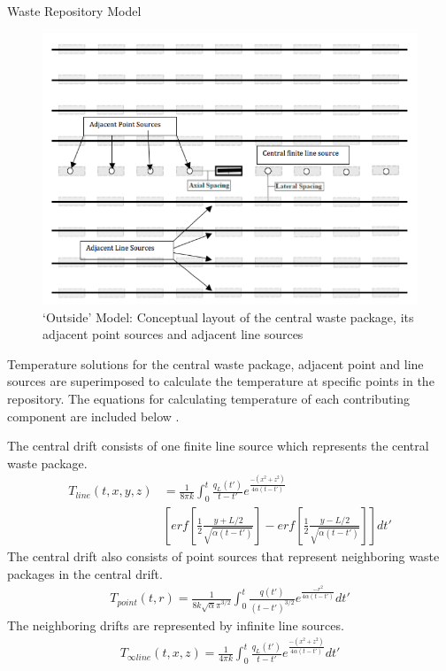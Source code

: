 \documentclass[final]{beamer}
\newlength{\onecolwid}
\newlength{\threecolwid}
\begin{document}
\begin{frame}[t]
\begin{columns}[t,totalwidth=\threecolwid]
\begin{column}{\onecolwid}
\begin{block}{Waste Repository Model}
\begin{figure}
	\label{fig:conceptual_layout}
	\includegraphics[width=1\linewidth]{outsidemodel}
	\caption{`Outside' Model: Conceptual layout of the central waste package, its adjacent
	point sources and adjacent line sources \cite{sutton_investigations_2011}}
\end{figure}

Temperature solutions for the central waste package, adjacent point and line sources 
are superimposed to calculate the temperature at specific points in the repository.
The equations for calculating temperature of each contributing component 
are included below \cite{sutton_investigations_2011,greenberg_application_2012,huff_numerical_2012}. 

The central drift consists of one finite line source which represents the central 
waste package.
\begin{align*}
	T_{line}(t,x,y,z) &= \frac{1}{8 \pi k}  \int _{0}^{t} \frac{q_L(t')}{t-t'}e^{\frac{-(x^2+z^2)}{4\alpha(t-t')}} \\
	&[erf[\frac{1}{2}\frac{y+L/2}{\sqrt{\alpha(t-t')}}]-erf[\frac{1}{2}\frac{y-L/2}{\sqrt{\alpha(t-t')}}]] dt'
\end{align*}
The central drift also consists of point sources that represent neighboring 
waste packages in the central drift. 
\begin{align*}
	T_{point}(t,r) = \frac{1}{8 k \sqrt{\alpha} \pi^{3/2}} \int_{0}^{t}\frac{q(t')}{(t-t')^{3/2}}e^{\frac{-r^2}{4\alpha(t-t')}}dt'
\end{align*}
The neighboring drifts are represented by infinite line sources.  
\begin{align*}
	T_{\infty line}(t,x,z) = \frac{1}{4\pi k} \int_0^t \frac{q_L(t')}{t-t'} e^{\frac{-(x^2+z^2)}{4\alpha (t-t')}} dt'
\end{align*}


\end{block}
\end{column}
\end{columns}
\end{frame}
\end{document}

